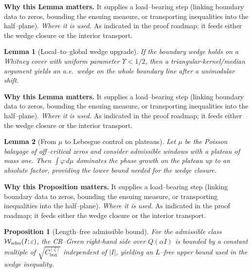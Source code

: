 \documentclass[11pt]{article}
\newtheorem{proposition}{Proposition}[section]
\newtheorem{lemma}{Lemma}[section]
\theoremstyle{definition}
\theoremstyle{remark}
\providecommand{\Cbox}{C^{(\zeta)}_{\mathrm{box}}}
\begin{document}
\noindent\textbf{Why this Lemma matters.} It supplies a load--bearing step (linking boundary data to zeros, bounding the ensuing measure, or transporting inequalities into the half--plane).
\noindent\textit{Where it is used.} As indicated in the proof roadmap; it feeds either the wedge closure or the interior transport.
\begin{lemma}[Local--to--global wedge upgrade]\label{lem:local-to-global-wedge}
If the boundary wedge holds on a Whitney cover with uniform parameter $\Upsilon<1/2$, then a triangular-kernel/median argument yields an a.e.\ wedge on the whole boundary line after a unimodular shift.
\end{lemma}

\noindent\textbf{Why this Lemma matters.} It supplies a load--bearing step (linking boundary data to zeros, bounding the ensuing measure, or transporting inequalities into the half--plane).
\noindent\textit{Where it is used.} As indicated in the proof roadmap; it feeds either the wedge closure or the interior transport.
\begin{lemma}[From $\mu$ to Lebesgue control on plateaus]\label{lem:mu-to-lebesgue}
Let $\mu$ be the Poisson balayage of off--critical zeros and consider admissible windows with a plateau of mass one. Then $\int \varphi\,d\mu$ dominates the phase growth on the plateau up to an absolute factor, providing the lower bound needed for the wedge closure.
\end{lemma}

\noindent\textbf{Why this Proposition matters.} It supplies a load--bearing step (linking boundary data to zeros, bounding the ensuing measure, or transporting inequalities into the half--plane).
\noindent\textit{Where it is used.} As indicated in the proof roadmap; it feeds either the wedge closure or the interior transport.
\begin{proposition}[Length--free admissible bound]\label{prop:length-free}
For the admissible class $\mathcal W_{\rm adm}(I;\varepsilon)$, the CR--Green right-hand side over $Q(\alpha I)$ is bounded by a constant multiple of $\sqrt{\Cbox}$ independent of $|I|$, yielding an $L$--free upper bound used in the wedge inequality.
\end{proposition}
\appendix
\end{document}

